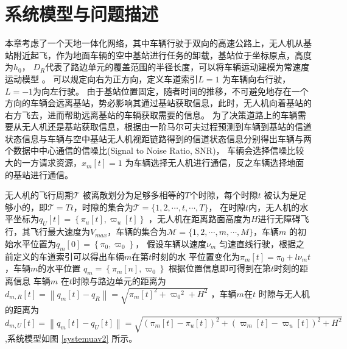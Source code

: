 \section{系统模型与问题描述}\label{section4-2}
本章考虑了一个天地一体化网络，其中车辆行驶于双向的高速公路上，无人机从基站附近起飞，作为地面车辆的空中基站进行任务的卸载，基站位于坐标原点，高度为$h_0$，
$D_R$代表了路边单元的覆盖范围的半径长度，可以将车辆运动建模为常速度运动模型 \supercite{COIFMAN1998271}。 可以规定向右为正方向，定义车道索引$L=1$ 为车辆向右行驶，$L=-1$为向左行驶。  %
由于基站位置固定，随者时间的推移，不可避免地存在一个方向的车辆会远离基站，势必影响其通过基站获取信息，此时，无人机向着基站的右方飞去，进而帮助远离基站的车辆获取需要的信息。
为了决策道路上的车辆需要从无人机还是基站获取信息，根据由一阶马尔可夫过程预测到车辆到基站的信道状态信息与车辆与空中基站无人机视距链路得到的信道状态信息分别得出车辆与两个数据中中心通信的信噪比(Signal to Noise Ratio, SNR)，
车辆会选择信噪比较大的一方请求资源，$x_m\left[t\right]=1$ 为车辆选择无人机进行通信，反之车辆选择地面的基站进行通信。

无人机的飞行周期$\mathcal{T}$ 被离散划分为足够多相等的$T $个时隙，每个时隙$t$ 被认为是足够小的，即$\mathcal{T}=Tt $，时隙的集合为$\mathcal{T}=\{1,2,\cdots ,t,\cdots ,T\}$，
在时隙$t$内，无人机的水平坐标为$q_U\left[t\right]=\left\{\pi_u\left[t\right],\varpi_u\left[t\right]\right\}$
，无人机在距离路面高度为$H$进行无障碍飞行，其飞行最大速度为$V_{max}$，车辆的集合为$\mathcal{M}=\{1,2,\cdots ,m,\cdots ,M\}$，车辆$m$ 的初始水平位置为$q_m\left[0\right]=\left\{\pi_0,\varpi_0\right\}$，
假设车辆以速度$\nu_m$ 匀速直线行驶，根据之前定义的车道索引可以得出车辆$m$在第$t$时刻的水
平位置变化为$\pi_m\left[t\right]=\pi_0+l\nu_m t$，车辆$m$的水平位置 $q_m=\left\{\pi_m\left[n\right],\varpi_0\right\}$
根据位置信息即可得到在第$t$时刻的距离信息
车辆$m$ 在$t$时隙与路边单元的距离为${{d}_{m,R}}\left[ t \right]=\left\| {{q}_{m}}\left[ t \right]-{{q}_{R}} \right\|=\sqrt{{{\pi}_{m}}{{\left[ t \right]}^{2}}+{{\varpi}_{0}}^{2}+{{H}^{2}}}$
，车辆$m$在$t$ 时隙与无人机的距离为
$
{{d}_{m,U}}\left[ t \right]=\left\| {{q}_{m}}\left[ t \right]-{{q}_{U}}\left[ t \right] \right\|=\sqrt{{{\left( {{\pi}_{m}}\left[ t \right]-{{\pi}_{u}}\left[ t \right] \right)}^{2}}+{{\left( {{\varpi}_{m}}\left[ t \right]-{{\varpi}_{u}}\left[ t \right] \right)}^{2}}+{{H}^{2}}}\
$,系统模型如图 \ref{systemuav2} 所示。%

